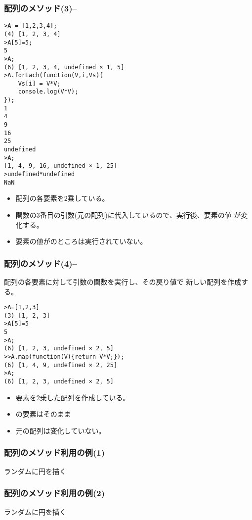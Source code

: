 \begin{frame}[containsverbatim]
 \frametitle{配列のメソッド(3)--}

\begin{Verbatim}[fontsize=\tiny]
 >A = [1,2,3,4];
(4) [1, 2, 3, 4]
>A[5]=5;
5
>A;
(6) [1, 2, 3, 4, undefined × 1, 5]
>A.forEach(function(V,i,Vs){
    Vs[i] = V*V;
    console.log(V*V);
});
1
4
9
16
25
undefined
>A;
[1, 4, 9, 16, undefined × 1, 25]
>undefined*undefined
NaN
\end{Verbatim}
 \begin{itemize}
  \item 配列の各要素を2乗している。
  \item 関数の3番目の引数(元の配列)に代入しているので、実行後、要素の値
 が変化する。
	\item 要素の値がのところは実行されていない。
 \end{itemize}
\end{frame}
\begin{frame}[containsverbatim]
 \frametitle{配列のメソッド(4)--}
 配列の各要素に対して引数の関数を実行し、その戻り値で
 新しい配列を作成する。
 \begin{Verbatim}[fontsize=\tiny]
>A=[1,2,3]
(3) [1, 2, 3]
>A[5]=5
5
>A;
(6) [1, 2, 3, undefined × 2, 5]
>>A.map(function(V){return V*V;});
(6) [1, 4, 9, undefined × 2, 25]
>A;
(6) [1, 2, 3, undefined × 2, 5]
 \end{Verbatim}
 \begin{itemize}
  \item 要素を2乗した配列を作成している。
  \item {}の要素はそのまま
  \item 元の配列は変化していない。
 \end{itemize}
\end{frame}
\begin{frame}[containsverbatim]
 \frametitle{配列のメソッド利用の例(1)}
 ランダムに円を描く
\end{frame}
\begin{frame}[containsverbatim]
 \frametitle{配列のメソッド利用の例(2)}
 ランダムに円を描く
\end{frame}
